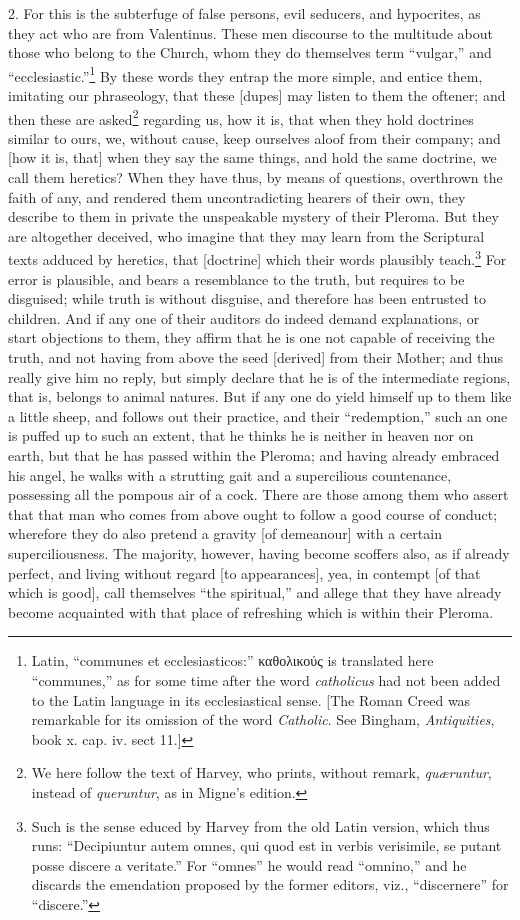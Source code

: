 2. For this is the subterfuge of false persons, evil seducers, and hypocrites, as they act who are from Valentinus. These men discourse to the multitude about those who belong to the Church, whom they do themselves term “vulgar,” and “ecclesiastic.”\footnote{Latin, “communes et ecclesiasticos:” \textgreek{καθολικούς} is translated here “communes,” as for some time after the word \emph{catholicus} had not been added to the Latin language in its ecclesiastical sense. [The Roman Creed was remarkable for its omission of the word \emph{Catholic}. See Bingham, \emph{Antiquities}, book x. cap. iv. sect 11.]} By these words they entrap the more simple, and entice them, imitating our phraseology, that these [dupes] may listen to them the oftener; and then these are asked\footnote{We here follow the text of Harvey, who prints, without remark, \emph{quæruntur}, instead of \emph{queruntur}, as in Migne’s edition.} regarding us, how it is, that when they hold doctrines similar to ours, we, without cause, keep ourselves aloof from their company; and [how it is, that] when they say the same things, and hold the same doctrine, we call them heretics? When they have thus, by means of questions, overthrown the faith of any, and rendered them uncontradicting hearers of their own, they describe to them in private the unspeakable mystery of their Pleroma. But they are altogether deceived, who imagine that they may learn from the Scriptural texts adduced by heretics, that [doctrine] which their words plausibly teach.\footnote{Such is the sense educed by Harvey from the old Latin version, which thus runs: “Decipiuntur autem omnes, qui quod est in verbis verisimile, se putant posse discere a veritate.” For “omnes” he would read “omnino,” and he discards the emendation proposed by the former editors, viz., “discernere” for “discere.”} For error is plausible, and bears a resemblance  to the truth, but requires to be disguised; while truth is without disguise, and therefore has been entrusted to children. And if any one of their auditors do indeed demand explanations, or start objections to them, they affirm that he is one not capable of receiving the truth, and not having from above the seed [derived] from their Mother; and thus really give him no reply, but simply declare that he is of the intermediate regions, that is, belongs to animal natures. But if any one do yield himself up to them like a little sheep, and follows out their practice, and their “redemption,” such an one is puffed up to such an extent, that he thinks he is neither in heaven nor on earth, but that he has passed within the Pleroma; and having already embraced his angel, he walks with a strutting gait and a supercilious countenance, possessing all the pompous air of a cock. There are those among them who assert that that man who comes from above ought to follow a good course of conduct; wherefore they do also pretend a gravity [of demeanour] with a certain superciliousness. The majority, however, having become scoffers also, as if already perfect, and living without regard [to appearances], yea, in contempt [of that which is good], call themselves “the spiritual,” and allege that they have already become acquainted with that place of refreshing which is within their Pleroma.

